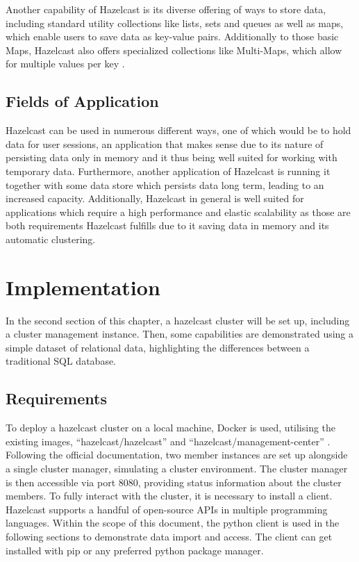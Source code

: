 Another capability of Hazelcast is its diverse offering of ways to store data, including standard utility collections like lists, sets and queues as well as maps, which enable users to save data as key-value pairs. Additionally to those basic Maps, Hazelcast also offers  
specialized collections like Multi-Maps, which allow for multiple values per key \parencite{Johns.2015}.
\subsection{Fields of Application} \label{subsec:fieldsOfApplicationHazelcast}

Hazelcast can be used in numerous different ways, one of which would be to hold data for user sessions, an application that makes sense due to its nature 
of persisting data only in memory and it thus being well suited for working with temporary data. Furthermore, another application of Hazelcast is 
running it together with some data store which persists data long term, leading to an increased capacity. Additionally, Hazelcast in general is well 
suited for applications which require a high performance and elastic scalability as those are both requirements Hazelcast fulfills due to it saving data in memory and 
its automatic clustering\parencite{Johns.2015}. \newline


\section{Implementation} \label{sec:implementationHazelcast}

In the second section of this chapter, a hazelcast cluster will be set up, including a cluster management 
instance. Then, some capabilities are demonstrated using a simple dataset of relational data, highlighting 
the differences between a traditional SQL database.

\subsection{Requirements} \label{subsec:requirementsHazelcast}

To deploy a hazelcast cluster on a local machine, Docker is used, utilising the existing images, 
\enquote{hazelcast/hazelcast} \textcite{Hazelcast.Docker.Hazelcast} and \enquote{hazelcast/management-center} 
\textcite{Hazelcast.Docker.ManagementCenter}. 
Following the official documentation, two member instances are set up alongside a single cluster manager, 
simulating a cluster environment. The cluster manager is then accessible via port 8080, providing status 
information about the cluster members. To fully interact with the cluster, it is necessary to install a 
client. Hazelcast supports a handful of open-source APIs in multiple programming languages. 
\textcite{Hazelcast.Clients} Within the scope of this document, the python client is 
used in the following sections to demonstrate data import and access. The client can get installed with pip 
or any preferred python package manager.

